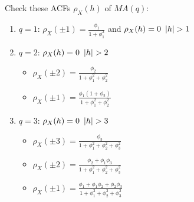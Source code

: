 \begin{exercise}
    Check these ACFs $\rho_X(h)$ of $MA(q)$:
    \begin{enumerate}
        \item $q=1$: $\rho_X(\pm1)=\frac{\phi_1}{1+\phi_1^2}$ and $\rho_X(h)=0\ \abs{h}>1$
        \item $q=2$: $\rho_X(h)=0\ \abs{h}>2$
        \begin{itemize}
            \item $\rho_X(\pm2)=\frac{\phi_2}{1+\phi_1^2+\phi_2^2}$
            \item $\rho_X(\pm1)=\frac{\phi_1(1+\phi_2)}{1+\phi_1^2+\phi_2^2}$
        \end{itemize}
        \item $q=3$: $\rho_X(h)=0\ \abs{h}>3$ 
        \begin{itemize}
            \item $\rho_X(\pm3)=\frac{\phi_3}{1+\phi_1^2+\phi_2^2+\phi_3^2}$
            \item $\rho_X(\pm2)=\frac{\phi_2+\phi_1\phi_3}{1+\phi_1^2+\phi_2^2+\phi_3^2}$
            \item $\rho_X(\pm1)=\frac{\phi_1+\phi_1\phi_2+\phi_2\phi_3}{1+\phi_1^2+\phi_2^2+\phi_3^2}$
        \end{itemize}
    \end{enumerate}
\end{exercise}
